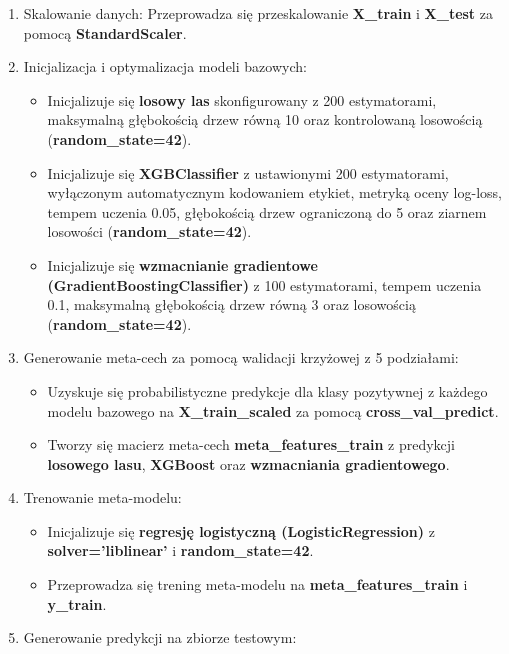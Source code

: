 \begin{enumerate}
	\def\labelenumi{\arabic{enumi}.}
	\item
	      Skalowanie danych: Przeprowadza się przeskalowanie \textbf{X\_train} i \textbf{X\_test} za pomocą \textbf{StandardScaler}.
	\item
	      Inicjalizacja i optymalizacja modeli bazowych:
	      \begin{itemize}
		      \item Inicjalizuje się \textbf{losowy las} skonfigurowany z 200 estymatorami, maksymalną głębokością drzew równą 10 oraz kontrolowaną losowością (\textbf{random\_state=42}).
		      \item Inicjalizuje się \textbf{XGBClassifier} z ustawionymi 200 estymatorami, wyłączonym automatycznym kodowaniem etykiet, metryką oceny log-loss, tempem uczenia 0.05, głębokością drzew ograniczoną do 5 oraz ziarnem losowości (\textbf{random\_state=42}).
		      \item Inicjalizuje się \textbf{wzmacnianie gradientowe (GradientBoostingClassifier)} z 100 estymatorami, tempem uczenia 0.1, maksymalną głębokością drzew równą 3 oraz losowością (\textbf{random\_state=42}).
	      \end{itemize}
	\item
	      Generowanie meta-cech za pomocą walidacji krzyżowej z 5 podziałami:
	      \begin{itemize}
		      \item Uzyskuje się probabilistyczne predykcje dla klasy pozytywnej z każdego modelu bazowego na \textbf{X\_train\_scaled} za pomocą \textbf{cross\_val\_predict}.
		      \item Tworzy się macierz meta-cech \textbf{meta\_features\_train} z predykcji \textbf{losowego lasu}, \textbf{XGBoost} oraz \textbf{wzmacniania gradientowego}.
	      \end{itemize}
	\item
	      Trenowanie meta-modelu:
	      \begin{itemize}
		      \item Inicjalizuje się \textbf{regresję logistyczną (\textbf{LogisticRegression})} z \textbf{solver='liblinear'} i \textbf{random\_state=42}.
		      \item Przeprowadza się trening meta-modelu na \textbf{meta\_features\_train} i \textbf{y\_train}.
	      \end{itemize}
	\item Generowanie predykcji na zbiorze testowym:
	      \begin{itemize}

\end{itemize}
\end{enumerate}
